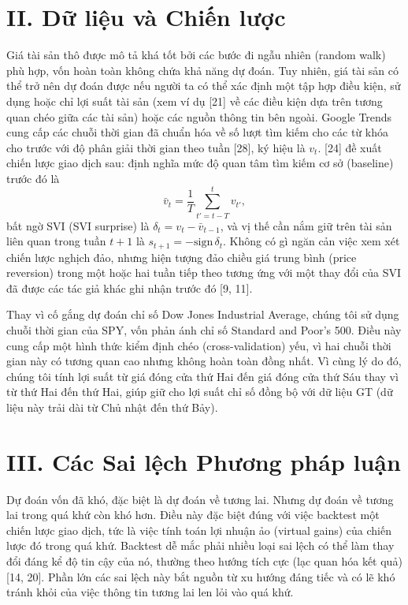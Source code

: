 \section{II. Dữ liệu và Chiến lược}

Giá tài sản thô được mô tả khá tốt bởi các bước đi ngẫu nhiên (random walk) phù hợp, vốn hoàn toàn không chứa khả năng dự đoán. Tuy nhiên, giá tài sản có thể trở nên dự đoán được nếu người ta có thể xác định một tập hợp điều kiện, sử dụng hoặc chỉ lợi suất tài sản (xem ví dụ [21] về các điều kiện dựa trên tương quan chéo giữa các tài sản) hoặc các nguồn thông tin bên ngoài. Google Trends cung cấp các chuỗi thời gian đã chuẩn hóa về số lượt tìm kiếm cho các từ khóa cho trước với độ phân giải thời gian theo tuần [28], ký hiệu là $v_t$. [24] đề xuất chiến lược giao dịch sau: định nghĩa mức độ quan tâm tìm kiếm cơ sở (baseline) trước đó là
$$
\bar v_t = \frac{1}{T}\sum_{t'=t-T}^{t} v_{t'},
$$
bất ngờ SVI (SVI surprise) là $\delta_t = v_t - \bar v_{t-1}$, và vị thế cần nắm giữ trên tài sản liên quan trong tuần $t+1$ là $s_{t+1} = -\text{sign}\,\delta_t$. Không có gì ngăn cản việc xem xét chiến lược nghịch đảo, nhưng hiện tượng đảo chiều giá trung bình (price reversion) trong một hoặc hai tuần tiếp theo tương ứng với một thay đổi của SVI đã được các tác giả khác ghi nhận trước đó [9, 11].

Thay vì cố gắng dự đoán chỉ số Dow Jones Industrial Average, chúng tôi sử dụng chuỗi thời gian của SPY, vốn phản ánh chỉ số Standard and Poor's 500. Điều này cung cấp một hình thức kiểm định chéo (cross-validation) yếu, vì hai chuỗi thời gian này có tương quan cao nhưng không hoàn toàn đồng nhất. Vì cùng lý do đó, chúng tôi tính lợi suất từ giá đóng cửa thứ Hai đến giá đóng cửa thứ Sáu thay vì từ thứ Hai đến thứ Hai, giúp giữ cho lợi suất chỉ số đồng bộ với dữ liệu GT (dữ liệu này trải dài từ Chủ nhật đến thứ Bảy).

\section{III. Các Sai lệch Phương pháp luận}

Dự đoán vốn đã khó, đặc biệt là dự đoán về tương lai. Nhưng dự đoán về tương lai trong quá khứ còn khó hơn. Điều này đặc biệt đúng với việc backtest một chiến lược giao dịch, tức là việc tính toán lợi nhuận ảo (virtual gains) của chiến lược đó trong quá khứ. Backtest dễ mắc phải nhiều loại sai lệch có thể làm thay đổi đáng kể độ tin cậy của nó, thường theo hướng tích cực (lạc quan hóa kết quả) [14, 20]. Phần lớn các sai lệch này bắt nguồn từ xu hướng đáng tiếc và có lẽ khó tránh khỏi của việc thông tin tương lai len lỏi vào quá khứ.

